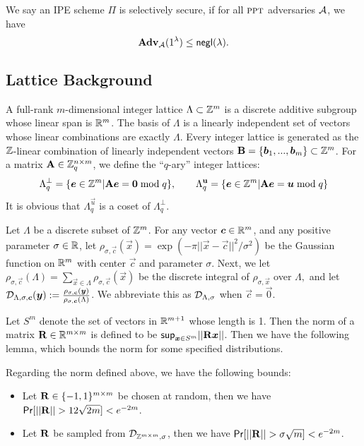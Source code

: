 \begin{definition}\label{defn:sec}
We say an IPE scheme $\Pi$ is selectively secure, if for all $\textsc{ppt}$ adversaries $\mathcal{A}$, we have 
$$\mathbf{Adv}_{\mathcal{A}}(1^\lambda) \leq \mathsf{negl}(\lambda).$$
\end{definition}


\subsection{Lattice Background}
A full-rank $m$-dimensional integer lattice $\Lambda\subset\mathbb{Z}^m$ is a discrete additive subgroup whose linear span is $\mathbb{R}^m$. The basis of $\Lambda$ is a linearly independent set of vectors whose linear combinations are exactly $\Lambda$. Every integer lattice is generated as the $\mathbb{Z}$-linear combination of linearly independent vectors $\mathbf{B}=\{\boldsymbol{b}_1,...,\boldsymbol{b}_m\}\subset\mathbb{Z}^m$. For a matrix $\mathbf{A}\in\mathbb{Z}^{n\times m}_q$, we define the ``$q$-ary'' integer lattices:
$$\Lambda_q^{\bot}=\{\boldsymbol{e} \in \mathbb{Z}^m| \mathbf{A} \boldsymbol{e} = \boldsymbol{0} \bmod q\},\qquad  \Lambda_q^{\mathbf{u}}=\{\boldsymbol{e}\in\mathbb{Z}^m|\mathbf{A}\boldsymbol{e} = \boldsymbol{u} \bmod q\}$$
It is obvious that $\Lambda_q^{\vec{u}}$ is a coset of $\Lambda_q^{\bot}$.

Let $\Lambda$ be a discrete subset of $\mathbb{Z}^m$. For any vector $\boldsymbol{c}\in\mathbb{R}^m$, and any positive parameter $\sigma\in\mathbb{R}$, let $\rho_{\sigma, \vec{c}}(\vec{x})=\exp(-\pi||\vec{x}-\vec{c}||^2 / \sigma^2)$ be the Gaussian function on $\mathbb{R}^m$ with center $\vec{c}$ and parameter $\sigma$. Next, we let $\rho_{\sigma, \vec{c}}(\Lambda)=\sum_{\vec{x}\in\Lambda}\rho_{\sigma, \vec{c}}(\vec{x})$ be the discrete integral of $\rho_{\sigma, \vec{x}}$ over $\Lambda,$ and let $\mathcal{D}_{\Lambda, \sigma, \boldsymbol{c}}(\boldsymbol{y}):=\frac{\rho_{\sigma, \boldsymbol{c}}(\boldsymbol{y})}{\rho_{\sigma, \boldsymbol{c}}(\Lambda)}$. We abbreviate this as $\mathcal{D}_{\Lambda, \sigma}$ when $\vec{c}=\vec{0}.$ 

Let $S^m$ denote the set of vectors in $\mathbb{R}^{m + 1}$ whose length is 1. Then the norm of a matrix $\mathbf{R} \in \mathbb{R}^{m \times m}$ is defined to be $\mathsf{sup}_{\boldsymbol{x} \in S^m} ||\mathbf{R} \boldsymbol{x}||$. Then we have the following lemma, which bounds the norm for some specified distributions.

\begin{lemma}\label{lem:bound}
Regarding the norm defined above, we have the following bounds:
\begin{itemize}
 \item Let $\mathbf{R} \in \{-1, 1\}^{m \times m}$ be chosen at random, then we have $\mathsf{Pr}[||\mathbf{R}|| > 12 \sqrt{2m}] < e^{-2m}$.
 \item Let $\mathbf{R}$ be sampled from $\mathcal{D}_{\mathbb{Z}^{m \times m}, \sigma}$, then we have $\mathsf{Pr} [||\mathbf{R}|| > \sigma \sqrt{m}] < e^{-2m}$.
\end{itemize}
\end{lemma}

